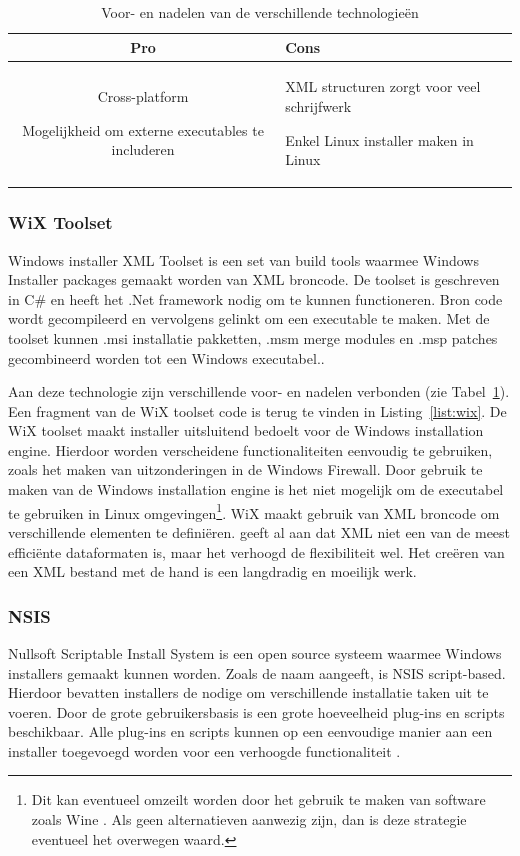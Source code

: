 \begin{table}[]
\begin{tabular*}{\linewidth}{clll}
\multicolumn{2}{p{0.5\linewidth}}{\centering Pro} & \multicolumn{2}{p{0.5\linewidth}}{\centering Cons} \\ \hline
\multicolumn{2}{p{0.5\linewidth}}{Cross-platform \par Mogelijkheid om externe executables te includeren}   & \multicolumn{2}{p{0.5\linewidth}}{XML structuren zorgt voor veel schrijfwerk \par Enkel Linux installer maken in Linux} \\ \hline
\end{tabular*}
\caption{Voor- en nadelen van de verschillende technologieën}
\label{tab:voorNadelen}
\end{table}

\subsubsection{WiX Toolset}
Windows installer XML Toolset is een set van build tools waarmee Windows Installer packages gemaakt worden van XML broncode.
De toolset is geschreven in C\# en heeft het .Net framework nodig om te kunnen functioneren.
Bron code wordt gecompileerd en vervolgens gelinkt om een executable te maken.
Met de toolset kunnen .msi installatie pakketten, .msm merge modules en .msp patches gecombineerd worden tot een Windows executabel.\citep{wixToolset}.

Aan deze technologie zijn verschillende voor- en nadelen verbonden (zie Tabel~\ref{tab:voorNadelen}).
Een fragment van de WiX toolset code is terug te vinden in Listing~\vref{list:wix}.
De WiX toolset maakt installer uitsluitend bedoelt voor de Windows installation engine.
Hierdoor worden verscheidene functionaliteiten eenvoudig te gebruiken, zoals het maken van uitzonderingen in de Windows Firewall.
Door gebruik te maken van de Windows installation engine is het niet mogelijk om de executabel te gebruiken in Linux omgevingen\footnote{Dit kan eventueel omzeilt worden door het gebruik te maken van software zoals Wine \citep{amstadt1994wine}. Als geen alternatieven aanwezig zijn, dan is deze strategie eventueel het overwegen waard.}.
WiX maakt gebruik van XML broncode om verschillende elementen te definiëren.
\citet{xmill} geeft al aan dat XML niet een van de meest efficiënte dataformaten is, maar het verhoogd de flexibiliteit wel.
Het creëren van een XML bestand met de hand is een langdradig en moeilijk werk.

\subsubsection{NSIS}
Nullsoft Scriptable Install System is een open source systeem waarmee Windows installers gemaakt kunnen worden.
Zoals de naam aangeeft, is NSIS script-based.
Hierdoor bevatten installers de nodige om verschillende installatie taken uit te voeren.
Door de grote gebruikersbasis is een grote hoeveelheid plug-ins en scripts beschikbaar.
Alle plug-ins en scripts kunnen op een eenvoudige manier aan een installer toegevoegd worden voor een verhoogde functionaliteit \citep{nsisMain}.

